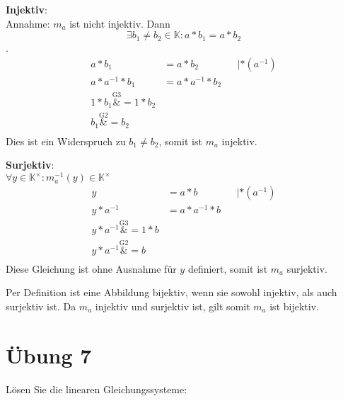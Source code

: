 \documentclass{article}
\begin{document}
\begin{enumerate}[(i)]
  \begin{minipage}[t]{.4\textwidth}
    \textbf{Injektiv}: \\
    Annahme: $m_a$ ist nicht injektiv. Dann
    \[
      \exists b_1 \ne b_2 \in \mathbb{K} \colon a * b_1 = a * b_2
    \].
    \begin{align*}
      a * b_1 &= a * b_2 && | * (a^{-1}) \\
      a * a^{-1} * b_1 &= a * a^{-1} * b_2 \\
      1 * b_1 \overset{\text{G3}}&= 1 * b_2 \\
      b_1 \overset{\text{G2}}&=  b_2 \\ 
    \end{align*}
    Dies ist ein Widerspruch zu $b_1 \ne b_2$, somit ist $m_a$ injektiv.
  \end{minipage}
  \hfill
  \vrule
  \hfill
  \begin{minipage}[t]{.4\textwidth}
    \textbf{Surjektiv}: \\
    $\forall y \in \mathbb{K}^{\times} \colon m_a^{-1}(y) \in \mathbb{K}^{\times}$
    \begin{align*}
      y &= a * b && | * (a^{-1}) \\
      y * a^{-1} &= a * a^{-1} * b \\
      y * a^{-1} \overset{\text{G3}}&= 1 * b \\
      y * a^{-1} \overset{\text{G2}}&= b \\
    \end{align*}
    Diese Gleichung ist ohne Ausnahme für $y$ definiert, somit ist $m_a$ surjektiv.
  \end{minipage}

  Per Definition ist eine Abbildung bijektiv, wenn sie sowohl injektiv, als auch surjektiv ist.
  Da $m_a$ injektiv und surjektiv ist, gilt somit $m_a$ ist bijektiv.

\end{enumerate}

\newpage
\section*{Übung 7}

Lösen Sie die linearen Gleichungssysteme:
\end{document}
